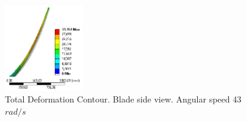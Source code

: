 \begin{figure}[H]
  \includegraphics[width=0.3\textwidth]{p2}
\caption{Total Deformation Contour. Blade side view. Angular speed 43 $rad/s$}
\label{fig:9}       %
\end{figure}

